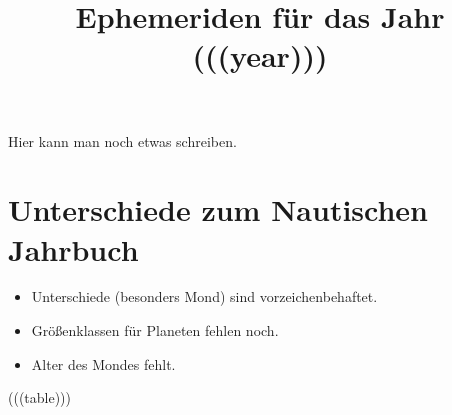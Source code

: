 \documentclass[a4paper, twoside]{book}
\title{Ephemeriden für das Jahr (((year)))}
\begin{document}
\sffamily
\maketitle
Hier kann man noch etwas schreiben.


\newpage

\section{Unterschiede zum Nautischen Jahrbuch}
\begin{itemize}
\item Unterschiede (besonders Mond) sind vorzeichenbehaftet.
\item Größenklassen für Planeten fehlen noch.
\item Alter des Mondes fehlt.
\end{itemize}

\newpage

(((table)))
\end{document}
